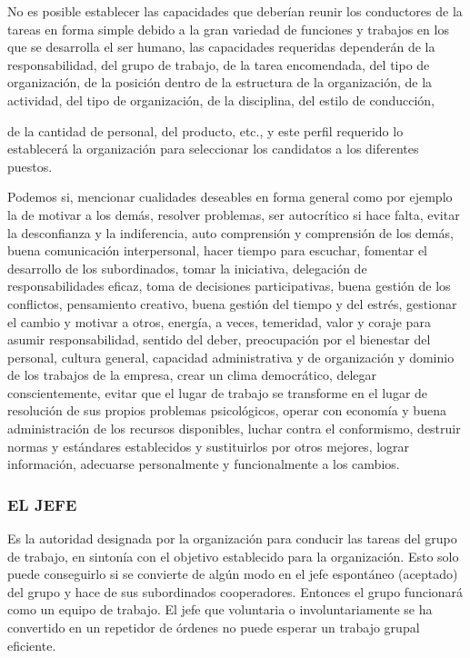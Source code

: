 No es posible establecer las capacidades que deberían reunir los conductores de la tareas en forma simple debido a la gran variedad de funciones y trabajos en los que se desarrolla el ser humano, las capacidades requeridas dependerán de la responsabilidad, del grupo de trabajo, de la tarea encomendada, del tipo de organización, de la posición dentro de la estructura de la organización, de la actividad, del tipo de organización, de la disciplina, del estilo de conducción,



de la cantidad de personal, del producto, etc., y este perfil requerido lo establecerá la organización para seleccionar los candidatos a los diferentes puestos.

Podemos si, mencionar cualidades deseables en forma general como por ejemplo la de motivar a los demás, resolver problemas, ser autocrítico si hace falta, evitar la desconfianza y la indiferencia, auto comprensión y comprensión de los demás, buena comunicación interpersonal, hacer tiempo para escuchar, fomentar el desarrollo de los subordinados, tomar la iniciativa, delegación de responsabilidades eficaz, toma de decisiones participativas, buena gestión de los conflictos, pensamiento creativo, buena gestión del tiempo y del estrés, gestionar el cambio y motivar a otros, energía, a veces, temeridad, valor y coraje para asumir responsabilidad, sentido del deber, preocupación por el bienestar del personal, cultura general, capacidad administrativa y de organización y dominio de los trabajos de la empresa, crear un clima democrático, delegar conscientemente, evitar que el lugar de trabajo se transforme en el lugar de resolución de sus propios problemas psicológicos, operar con economía y buena administración de los recursos disponibles, luchar contra el conformismo, destruir normas y estándares establecidos y sustituirlos por otros mejores, lograr información, adecuarse personalmente y funcionalmente a los cambios.

\subsubsection*{EL JEFE}
Es la autoridad designada por la organización para conducir las tareas del grupo de trabajo, en sintonía con el objetivo establecido para la organización. Esto solo puede conseguirlo si se convierte de algún modo en el jefe espontáneo (aceptado) del grupo y hace de sus subordinados cooperadores. Entonces el grupo funcionará como un equipo de trabajo. El jefe que voluntaria o involuntariamente se ha convertido en un repetidor de órdenes no puede esperar un trabajo grupal eficiente.

